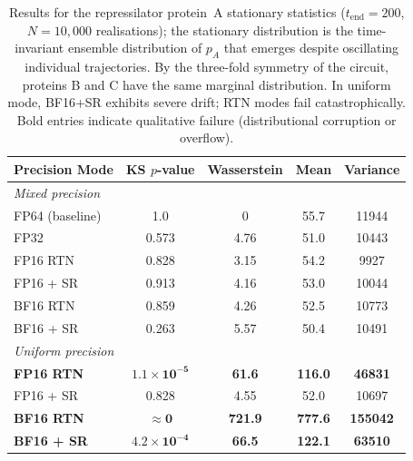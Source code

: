 \documentclass{article}
\begin{document}
\begin{table}[ht]
    \centering
    \begin{tabular}{@{}lcccc@{}}
        \toprule
        Precision Mode & KS $p$-value & Wasserstein & Mean & Variance \\
        \midrule
        \multicolumn{5}{l}{\textit{Mixed precision}} \\
        \midrule
        FP64 (baseline) & 1.0 & 0 & 55.7 & 11944 \\
        FP32 & 0.573 & 4.76 & 51.0 & 10443 \\
        FP16 RTN & 0.828 & 3.15 & 54.2 & 9927 \\
        FP16 + SR & 0.913 & 4.16 & 53.0 & 10044 \\
        BF16 RTN & 0.859 & 4.26 & 52.5 & 10773 \\
        BF16 + SR & 0.263 & 5.57 & 50.4 & 10491 \\
        \midrule
        \multicolumn{5}{l}{\textit{Uniform precision}} \\
        \midrule
        \textbf{FP16 RTN} & $\mathbf{1.1 \times 10^{-5}}$ & \textbf{61.6} & \textbf{116.0} & \textbf{46831} \\
        FP16 + SR & 0.828 & 4.55 & 52.0 & 10697 \\
        \textbf{BF16 RTN} & $\mathbf{\approx 0}$ & \textbf{721.9} & \textbf{777.6} & \textbf{155042} \\
        \textbf{BF16 + SR} & $\mathbf{4.2 \times 10^{-4}}$ & \textbf{66.5} & \textbf{122.1} & \textbf{63510} \\
        \bottomrule
    \end{tabular}
    \caption{Results for the repressilator protein~A stationary statistics ($t_{\mathrm{end}} = 200$, $N = 10{,}000$ realisations); the stationary distribution is the time-invariant ensemble distribution of $p_A$ that emerges despite oscillating individual trajectories. By the three-fold symmetry of the circuit, proteins B and C have the same marginal distribution. In uniform mode, BF16+SR exhibits severe drift; RTN modes fail catastrophically. Bold entries indicate qualitative failure (distributional corruption or overflow).}
    \label{tab:repressilator}
\end{table}
\end{document}
